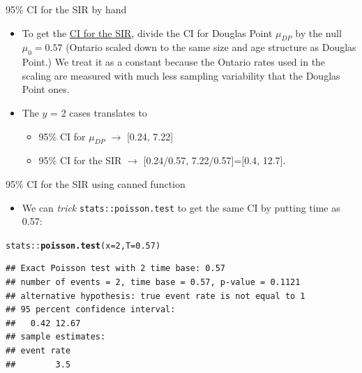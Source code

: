 \documentclass[10pt]{beamer}\usepackage[]{graphicx}\usepackage[]{color}
\makeatletter
\newcommand{\hlnum}[1]{\textcolor[rgb]{0.686,0.059,0.569}{#1}}%
\newcommand{\hlopt}[1]{\textcolor[rgb]{0,0,0}{#1}}%
\newcommand{\hlstd}[1]{\textcolor[rgb]{0.345,0.345,0.345}{#1}}%
\newcommand{\hlkwc}[1]{\textcolor[rgb]{0.333,0.667,0.333}{#1}}%
\newcommand{\hlkwd}[1]{\textcolor[rgb]{0.737,0.353,0.396}{\textbf{#1}}}%
\newenvironment{kframe}{%
 \def\at@end@of@kframe{}%
 \ifinner\ifhmode%
  \def\at@end@of@kframe{\end{minipage}}%
  \begin{minipage}{\columnwidth}%
 \fi\fi%
 \def\FrameCommand##1{\hskip\@totalleftmargin \hskip-\fboxsep
 \colorbox{shadecolor}{##1}\hskip-\fboxsep
     \hskip-\linewidth \hskip-\@totalleftmargin \hskip\columnwidth}%
 \MakeFramed {\advance\hsize-\width
   \@totalleftmargin\z@ \linewidth\hsize
   \@setminipage}}%
 {\par\unskip\endMakeFramed%
 \at@end@of@kframe}
\newenvironment{knitrout}{}{} %
\makeatother
\begin{document}
\begin{frame}[fragile]{95\% CI for the SIR by hand}
	
	
	\small
	\begin{itemize}
		\setlength\itemsep{1.2em}
		
		\item To get the \underline{CI for the SIR}, divide the CI for Douglas Point $\mu_{DP}$ by the null $\mu_0 = 0.57$ (Ontario scaled down to the same size and age structure as Douglas Point.) We treat it as a constant because the Ontario rates used in the scaling are measured with much less sampling variability that the Douglas Point ones.
		
		\pause 
		
		\item The $y$ = 2 cases translates to
		\begin{itemize}
			\item 95\% CI for $\mu_{DP}$ $\to$ [0.24, 7.22]
			\item 95\% CI for the SIR $\to$ [0.24/0.57, 7.22/0.57]=[0.4, 12.7].
		\end{itemize}
	\end{itemize}
	
\end{frame}



\begin{frame}[fragile]{95\% CI for the SIR using canned function}
	
	
	\small
	\begin{itemize}
		\setlength\itemsep{1.2em}
		
		\item We can \textit{trick}  \texttt{stats::poisson.test} 
		to get the same CI by putting time as 0.57: 
		
		
	\end{itemize}
	
\begin{knitrout}\tiny
{}\color{fgcolor}\begin{kframe}
\begin{alltt}
\hlstd{stats}\hlopt{::}\hlkwd{poisson.test}\hlstd{(}\hlkwc{x}\hlstd{=}\hlnum{2}\hlstd{,}\hlkwc{T}\hlstd{=}\hlnum{0.57}\hlstd{)}
\end{alltt}
\begin{verbatim}
## Exact Poisson test with 2 time base: 0.57 
## number of events = 2, time base = 0.57, p-value = 0.1121
## alternative hypothesis: true event rate is not equal to 1 
## 95 percent confidence interval:
##   0.42 12.67 
## sample estimates:
## event rate 
##        3.5
\end{verbatim}
\end{kframe}
\end{knitrout}
	
\end{frame}
\end{document}

